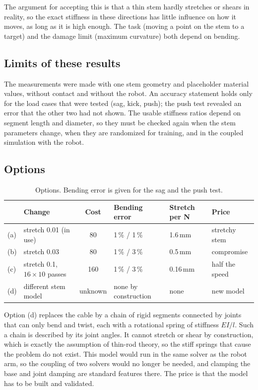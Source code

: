 \documentclass[11pt,a4paper]{article}
\begin{document}
The argument for accepting this is that a thin stem hardly stretches or shears in reality, so the exact
stiffness in these directions has little influence on how it moves, as long as it is high enough. The task
(moving a point on the stem to a target) and the damage limit (maximum curvature) both depend on bending.

\subsection{Limits of these results}

The measurements were made with one stem geometry and placeholder material values, without contact and
without the robot. An accuracy statement holds only for the load cases that were tested (sag, kick, push);
the push test revealed an error that the other two had not shown. The usable stiffness ratios depend on
segment length and diameter, so they must be checked again when the stem parameters change, when they are
randomized for training, and in the coupled simulation with the robot.

\subsection{Options}

\begin{table}[h]
  \centering
  \caption{Options. Bending error is given for the sag and the push test.}
  \label{tab:stem-options}
  \begin{tabular}{llclll}
    \toprule
     & Change & Cost & Bending error & Stretch per N & Price \\
    \midrule
    (a) & stretch 0.01 (in use) & 80  & 1\,\% / 1\,\%  & 1.6\,mm  & stretchy stem \\
    (b) & stretch 0.03          & 80  & 1\,\% / 3\,\%  & 0.5\,mm  & compromise \\
    (c) & stretch 0.1, $16 \times 10$ passes & 160 & 1\,\% / 3\,\% & 0.16\,mm & half the speed \\
    (d) & different stem model          & unknown & none by construction & none & new model \\
    \bottomrule
  \end{tabular}
\end{table}

Option (d) replaces the cable by a chain of rigid segments connected by joints that can only bend and
twist, each with a rotational spring of stiffness $EI/l$. Such a chain is described by its joint angles. It
cannot stretch or shear by construction, which is exactly the assumption of thin-rod theory, so the stiff
springs that cause the problem do not exist. This model would run in the same solver as the robot arm, so
the coupling of two solvers would no longer be needed, and clamping the base and joint damping are
standard features there. The price is that the model has to be built and validated.
\end{document}
